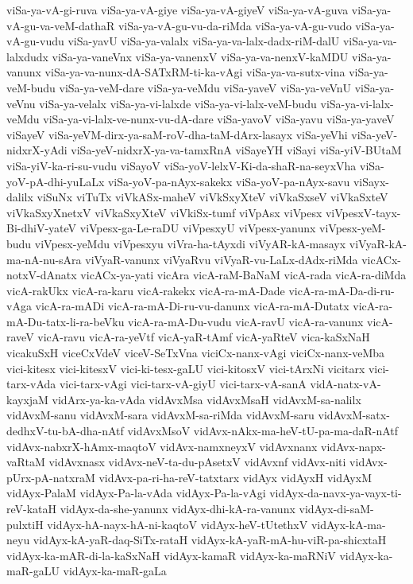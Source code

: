 {viSa-ya-vA-gi-ruva
viSa-ya-vA-giye
viSa-ya-vA-giyeV
viSa-ya-vA-guva
viSa-ya-vA-gu-va-veM-dathaR
viSa-ya-vA-gu-vu-da-riMda
viSa-ya-vA-gu-vudo
viSa-ya-vA-gu-vudu
viSa-yavU
viSa-ya-valalx
viSa-ya-va-lalx-dadx-riM-dalU
viSa-ya-va-lalxdudx
viSa-ya-vaneVnx
viSa-ya-vanenxV
viSa-ya-va-nenxV-kaMDU
viSa-ya-vanunx
viSa-ya-va-nunx-dA-SATxRM-ti-ka-vAgi
viSa-ya-va-sutx-vina
viSa-ya-veM-budu
viSa-ya-veM-dare
viSa-ya-veMdu
viSa-yaveV
viSa-ya-veVnU
viSa-ya-veVnu
viSa-ya-velalx
viSa-ya-vi-lalxde
viSa-ya-vi-lalx-veM-budu
viSa-ya-vi-lalx-veMdu
viSa-ya-vi-lalx-ve-nunx-vu-dA-dare
viSa-yavoV
viSa-yavu
viSa-ya-yaveV
viSayeV
viSa-yeVM-dirx-ya-saM-roV-dha-taM-dArx-lasayx
viSa-yeVhi
viSa-yeV-nidxrX-yAdi
viSa-yeV-nidxrX-ya-va-tamxRnA
viSayeYH
viSayi
viSa-yiV-BUtaM
viSa-yiV-ka-ri-su-vudu
viSayoV
viSa-yoV-lelxV-Ki-da-shaR-na-seyxVha
viSa-yoV-pA-dhi-yuLaLx
viSa-yoV-pa-nAyx-sakekx
viSa-yoV-pa-nAyx-savu
viSayx-dalilx
viSuNx
viTuTx
viVkASx-maheV
viVkSxyXteV
viVkaSxseV
viVkaSxteV
viVkaSxyXnetxV
viVkaSxyXteV
viVkiSx-tumf
viVpAsx
viVpesx
viVpesxV-tayx-Bi-dhiV-yateV
viVpesx-ga-Le-raDU
viVpesxyU
viVpesx-yanunx
viVpesx-yeM-budu
viVpesx-yeMdu
viVpesxyu
viVra-ha-tAyxdi
viVyAR-kA-masayx
viVyaR-kA-ma-nA-nu-sAra
viVyaR-vanunx
viVyaRvu
viVyaR-vu-LaLx-dAdx-riMda
vicACx-notxV-dAnatx
vicACx-ya-yati
vicAra
vicA-raM-BaNaM
vicA-rada
vicA-ra-diMda
vicA-rakUkx
vicA-ra-karu
vicA-rakekx
vicA-ra-mA-Dade
vicA-ra-mA-Da-di-ru-vAga
vicA-ra-mADi
vicA-ra-mA-Di-ru-vu-danunx
vicA-ra-mA-Dutatx
vicA-ra-mA-Du-tatx-li-ra-beVku
vicA-ra-mA-Du-vudu
vicA-ravU
vicA-ra-vanunx
vicA-raveV
vicA-ravu
vicA-ra-yeVtf
vicA-yaR-tAmf
vicA-yaRteV
vica-kaSxNaH
vicakuSxH
viceCxVdeV
viceV-SeTxVna
viciCx-nanx-vAgi
viciCx-nanx-veMba
vici-kitesx
vici-kitesxV
vici-ki-tesx-gaLU
vici-kitosxV
vici-tArxNi
vicitarx
vici-tarx-vAda
vici-tarx-vAgi
vici-tarx-vA-giyU
vici-tarx-vA-sanA
vidA-natx-vA-kayxjaM
vidArx-ya-ka-vAda
vidAvxMsa
vidAvxMsaH
vidAvxM-sa-nalilx
vidAvxM-sanu
vidAvxM-sara
vidAvxM-sa-riMda
vidAvxM-saru
vidAvxM-satx-dedhxV-tu-bA-dha-nAtf
vidAvxMsoV
vidAvx-nAkx-ma-heV-tU-pa-ma-daR-nAtf
vidAvx-nabxrX-hAmx-maqtoV
vidAvx-namxneyxV
vidAvxnanx
vidAvx-napx-vaRtaM
vidAvxnasx
vidAvx-neV-ta-du-pAsetxV
vidAvxnf
vidAvx-niti
vidAvx-pUrx-pA-natxraM
vidAvx-pa-ri-ha-reV-tatxtarx
vidAyx
vidAyxH
vidAyxM
vidAyx-PalaM
vidAyx-Pa-la-vAda
vidAyx-Pa-la-vAgi
vidAyx-da-navx-ya-vayx-ti-reV-kataH
vidAyx-da-she-yanunx
vidAyx-dhi-kA-ra-vanunx
vidAyx-di-saM-pulxtiH
vidAyx-hA-nayx-hA-ni-kaqtoV
vidAyx-heV-tUtethxV
vidAyx-kA-ma-neyu
vidAyx-kA-yaR-daq-SiTx-rataH
vidAyx-kA-yaR-mA-hu-viR-pa-shicxtaH
vidAyx-ka-mAR-di-la-kaSxNaH
vidAyx-kamaR
vidAyx-ka-maRNiV
vidAyx-ka-maR-gaLU
vidAyx-ka-maR-gaLa
}
